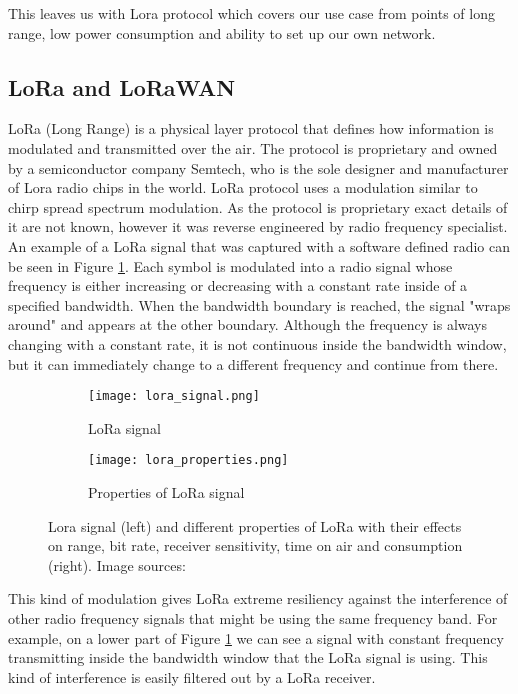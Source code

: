 This leaves us with Lora protocol which covers our use case from points of long range, low power consumption and ability to set up our own network. 


\subsection{ LoRa and LoRaWAN}

LoRa (Long Range) is a physical layer protocol that defines how information is modulated and transmitted over the air\cite{lora_article}\cite{lora_nbiot}.
The protocol is proprietary and owned by a semiconductor company Semtech, who is the sole designer and manufacturer of Lora radio chips in the world.
LoRa protocol uses a modulation similar to chirp spread spectrum modulation\cite{lora_article}.
As the protocol is proprietary exact details of it are not known, however it was reverse engineered by radio frequency specialist\cite{lora_github}.
An example of a LoRa signal that was captured with a software defined radio can be seen in Figure \ref{lora1}.
Each symbol is modulated into a radio signal whose frequency is either increasing or decreasing with a constant rate inside of a specified bandwidth.
When the bandwidth boundary is reached, the signal "wraps around" and appears at the other boundary.
Although the frequency is always changing with a constant rate, it is not continuous inside the bandwidth window, but it can immediately change to a different frequency and continue from there.

\begin{figure}[ht]
    \begin{subfigure}{0.3\textwidth}
        \centering
        \texttt{[image: lora\_signal.png]} 
        \caption{ LoRa signal}
        \label{lora1}
    \end{subfigure}
    \hspace{0.5cm}%
    \begin{subfigure}{0.7\textwidth}
        \texttt{[image: lora\_properties.png]}
        \caption{ Properties of LoRa signal}
        \label{lora2}
    \end{subfigure}
    \caption{Lora signal (left) and different properties of LoRa with their effects on range, bit rate, receiver sensitivity, time on air and consumption (right). Image sources:\cite{lora_github}\cite{lora_philly}}
    \label{lora}
\end{figure}

This kind of modulation gives LoRa extreme resiliency against the interference of other radio frequency signals that might be using the same frequency band\cite{lora_article}\cite{lora_philly}.
For example, on a lower part of Figure \ref{lora1} we can see a signal with constant frequency transmitting inside the bandwidth window that the LoRa signal is using.
This kind of interference is easily filtered out by a LoRa receiver.

